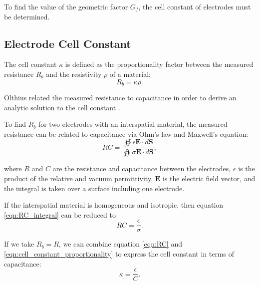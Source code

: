   \par To find the value of the geometric factor $G_f$, the cell constant of electrodes must be determined.
  
  
  \subsection{Electrode Cell Constant}
  \label{sec:electrode_cell_constant}
  \par The cell constant $\kappa$ is defined as the proportionality factor between the measured resistance $R_b$ and the resistivity $\rho$ of a material:
  \begin{equation}
      R_b = \kappa \rho.
      \label{eqn:cell_constant_proportionality}
  \end{equation}
  
  \noindent  Olthius related the measured resistance to capacitance in order to derive an analytic solution to the cell constant \cite{olthuis_theoretical_1995}. 
  
  \par To find $R_b$ for two electrodes with an interspatial material, the measured resistance can be related to capacitance via Ohm's law and Maxwell's equation:
  \begin{equation}
      RC = \frac{\oiint \epsilon \boldsymbol{E} \cdot d\boldsymbol{S}}{\oiint \sigma\boldsymbol{E}\cdot d\boldsymbol{S}},
      \label{eqn:RC_integral}
  \end{equation}
  
  \noindent where $R$ and $C$ are the resistance and capacitance between the electrodes, $\epsilon$ is the product of the relative and vacuum permittivity, $\boldsymbol{E}$ is the electric field vector, and the integral is taken over a surface including one electrode.
  
  \par If the interspatial material is homogeneous and isotropic, then equation \ref{eqn:RC_integral} can be reduced to
  \begin{equation}
      RC = \frac{\epsilon}{\sigma}.
      \label{eqn:RC}
  \end{equation}
  
  \par If we take $R_b = R$, we can combine equation \ref{eqn:RC} and \ref{eqn:cell_constant_proportionality} to express the cell constant in terms of capacitance:
  \begin{equation}
      \kappa = \frac{\epsilon}{C}.
      \label{eqn:cell_constant_C}
  \end{equation}
  
